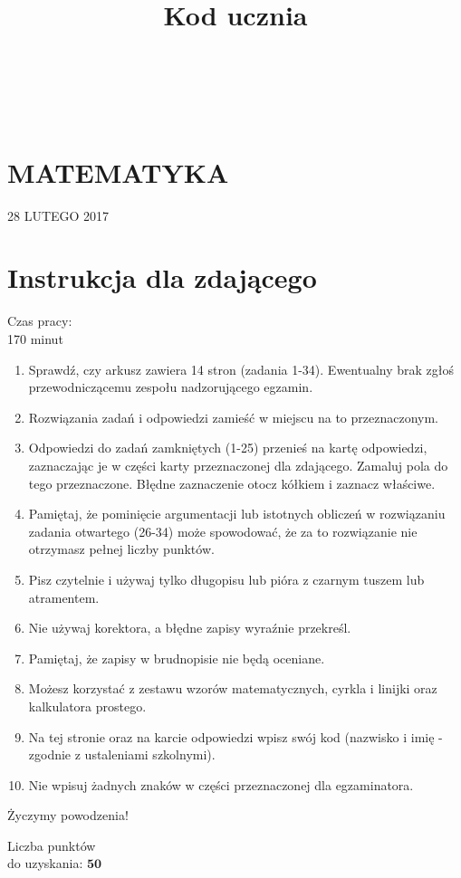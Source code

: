 \documentclass[10pt]{article}
\title{Kod ucznia }
\author{}
\date{}
\begin{document}
\maketitle
\(\qquad\)\\
\(\qquad\)

\section*{MATEMATYKA}
28 LUTEGO 2017

\section*{Instrukcja dla zdającego}
Czas pracy:\\
170 minut

\begin{enumerate}
  \item Sprawdź, czy arkusz zawiera 14 stron (zadania 1-34). Ewentualny brak zgłoś przewodniczącemu zespołu nadzorującego egzamin.
  \item Rozwiązania zadań i odpowiedzi zamieść w miejscu na to przeznaczonym.
  \item Odpowiedzi do zadań zamkniętych (1-25) przenieś na kartę odpowiedzi, zaznaczając je w części karty przeznaczonej dla zdającego. Zamaluj pola do tego przeznaczone. Błędne zaznaczenie otocz kółkiem i zaznacz właściwe.
  \item Pamiętaj, że pominięcie argumentacji lub istotnych obliczeń w rozwiązaniu zadania otwartego (26-34) może spowodować, że za to rozwiązanie nie otrzymasz pełnej liczby punktów.
  \item Pisz czytelnie i używaj tylko długopisu lub pióra z czarnym tuszem lub atramentem.
  \item Nie używaj korektora, a błędne zapisy wyraźnie przekreśl.
  \item Pamiętaj, że zapisy w brudnopisie nie będą oceniane.
  \item Możesz korzystać z zestawu wzorów matematycznych, cyrkla i linijki oraz kalkulatora prostego.
  \item Na tej stronie oraz na karcie odpowiedzi wpisz swój kod (nazwisko i imię - zgodnie z ustaleniami szkolnymi).
  \item Nie wpisuj żadnych znaków w części przeznaczonej dla egzaminatora.
\end{enumerate}

Życzymy powodzenia!

Liczba punktów\\
do uzyskania: \(\mathbf{5 0}\)
\end{document}
